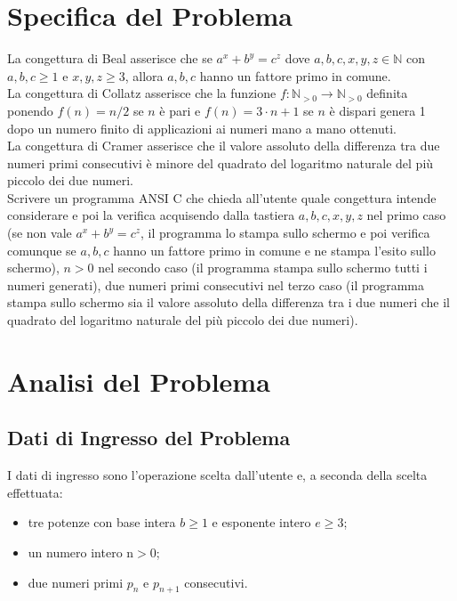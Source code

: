 \documentclass[10pt]{report}
\begin{document}
\section{Specifica del Problema}
La congettura di Beal asserisce che se $a^x + b^y = c^z$ dove $a,b,c,x,y,z \in \mathbb{N}$ con $a,b,c\ge1$ e $x,y,z\ge3$, allora $a,b,c$ hanno un fattore primo in comune.\\ 
La congettura di Collatz asserisce che la funzione $f:\mathbb{N}_{>0}\longrightarrow\mathbb{N}_{>0}$ definita ponendo $f(n) = n/2$ se $n$ è pari e $f(n) = 3 \cdot n + 1$ se $n$ 
è dispari genera 1 dopo un numero finito di applicazioni ai numeri mano a mano ottenuti.\\ 
La congettura di Cramer asserisce che il valore assoluto della differenza tra due numeri primi consecutivi è minore del quadrato del logaritmo naturale del più piccolo dei due 
numeri.\\ 
Scrivere un programma ANSI C che chieda all'utente quale congettura intende considerare e poi la verifica acquisendo dalla tastiera $a,b,c,x,y,z$ nel primo caso 
(se non vale  $a^x + b^y = c^z$, il programma lo stampa sullo schermo e poi verifica comunque se $a,b,c$ hanno un fattore primo in comune e ne stampa l'esito sullo schermo), 
$n>0$ nel secondo caso (il programma stampa sullo schermo tutti i numeri generati), due numeri primi consecutivi nel terzo caso 
(il programma stampa sullo schermo sia il valore assoluto della differenza tra i due numeri che il quadrato del logaritmo naturale del più piccolo dei due numeri). 

\newpage

\section{Analisi del Problema}
\subsection{Dati di Ingresso del Problema}
I dati di ingresso sono l'operazione scelta dall'utente e, a seconda della scelta effettuata:

\begin{itemize}
\item tre potenze con base intera $b\ge1$ e esponente intero $e\ge3$;
\item un numero intero n$>0$;
\item due numeri primi $p_n$ e $p_{n+1}$ consecutivi.
\end{itemize}
\end{document}
